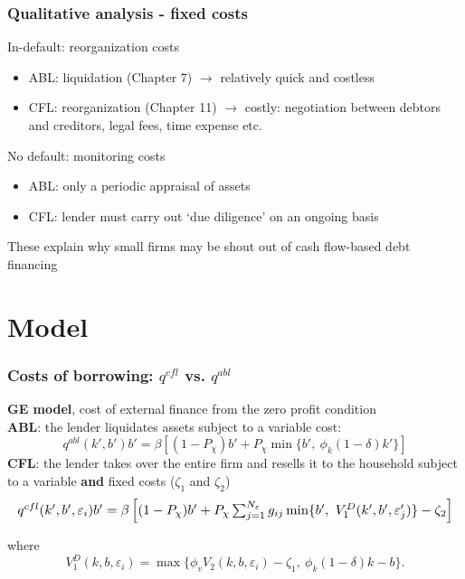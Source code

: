 \documentclass[notes]{beamer}
\begin{document}
\begin{frame}[label=slide2]
\frametitle{Qualitative analysis - fixed costs}
In-default:  reorganization costs
\begin{itemize}
\item ABL: liquidation (Chapter 7)  $\rightarrow$ relatively quick and costless
\item CFL: reorganization (Chapter 11) $\rightarrow$ costly: negotiation between debtors and creditors, legal fees, time expense etc.
\end{itemize} \vspace{3mm}
No default: monitoring costs
\begin{itemize}
\item ABL: only a periodic appraisal of assets
\item CFL: lender must carry out `due diligence' on an ongoing basis
\end{itemize}
These explain why small firms may be shout out of cash flow-based debt financing

\end{frame}


\section{Model}

\begin{frame}[label=slide2]
\frametitle{Costs of borrowing: $q^{cfl}$ vs. $q^{abl}$}
\textbf{GE model}, cost of external finance from the zero profit condition \vspace{4mm} \\
\textbf{ABL}: the lender liquidates assets subject to a variable cost:
$$ q^{abl}(k',b')b' = \beta \left[ (1-P_\chi) b' + P_\chi \min\{b', \ \phi_k (1-\delta) k' \} \right]    $$ 
\textbf{CFL}: the lender takes over the entire firm and resells it to the household subject to a variable \textbf{and} fixed costs ($\zeta_1$ and $\zeta_2$)
\begin{equation*}
    \resizebox{1\hsize}{!}{$
    q^{cfl}(k',b',\varepsilon_i)b' = \beta \left[ (1-P_\chi) b' + P_\chi \sum_{j=1}^{N_\varepsilon} g_{ij}  \min\{b', \ V^D_1(k',b',\varepsilon_j')  \} - \zeta_2 \right]
    $}
\end{equation*}

where 
$$V_1^D(k,b,\varepsilon_i) = \max \Big\{ \phi_vV_2(k,b,\varepsilon_i)- \zeta_1, \  \phi_k (1-\delta) k - b \Big\}.$$
\end{frame}
\end{document}
